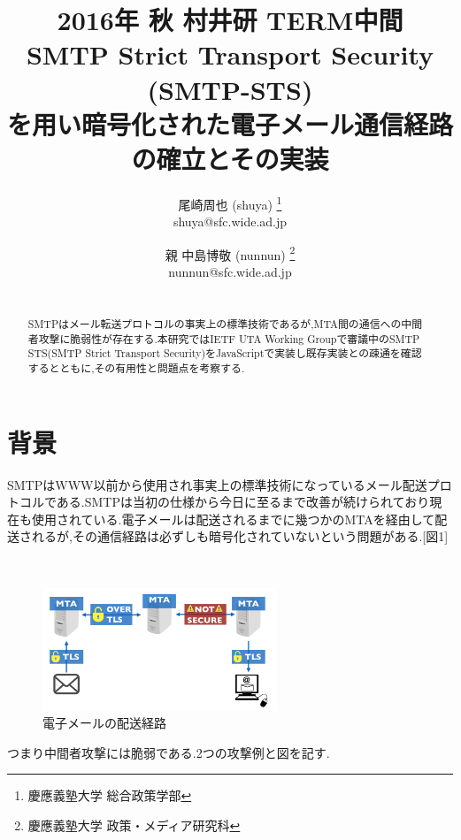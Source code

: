 \documentclass[a4j,10pt]{jsarticle}
\begin{document}

\title{2016年 秋 村井研 TERM中間\\
SMTP Strict Transport Security (SMTP-STS)
\\を用い暗号化された電子メール通信経路の確立とその実装}

\author{
    尾崎周也 (shuya) \thanks{慶應義塾大学 総合政策学部}
    \\shuya@sfc.wide.ad.jp
    \and
    親 中島博敬 (nunnun) \thanks{慶應義塾大学 政策・メディア研究科}
    \\nunnun@sfc.wide.ad.jp
}


\begin{abstract}
\\SMTPはメール転送プロトコルの事実上の標準技術であるが,MTA間の通信への中間者攻撃に脆弱性が存在する.本研究ではIETF UTA Working Groupで審議中のSMTP STS(SMTP Strict Transport Security)をJavaScriptで実装し既存実装との疎通を確認するとともに,その有用性と問題点を考察する.
\end{abstract}

\maketitle
\thispagestyle{empty}

\section{背景}

SMTPはWWW以前から使用され事実上の標準技術になっているメール配送プロトコルである.SMTPは当初の仕様から今日に至るまで改善が続けられており現在も使用されている.電子メールは配送されるまでに幾つかのMTAを経由して配送されるが,その通信経路は必ずしも暗号化されていないという問題がある.[図1]
\begin{figure}[htbp]
　\begin{center}
      \includegraphics[width=7cm]{figure1.png}
      \caption{電子メールの配送経路}
    \end{center}
\end{figure}

つまり中間者攻撃には脆弱である.2つの攻撃例と図を記す.
\end{document}
